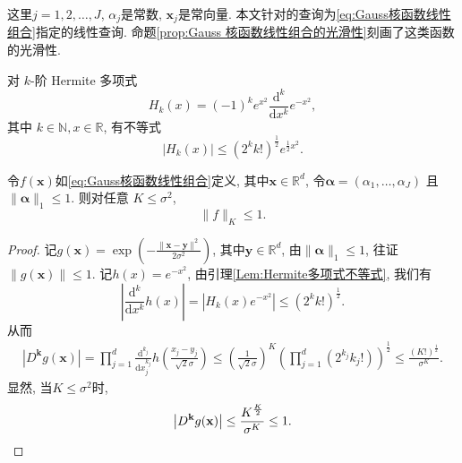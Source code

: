 这里$j = 1, 2, \dots, J$, $\alpha_j$是常数, $\mathbf{x}_j$是常向量. 本文针对的查询为\eqref{eq:Gauss核函数线性组合}指定的线性查询. 命题\ref{prop:Gauss 核函数线性组合的光滑性}刻画了这类函数的光滑性.
\begin{lem}\label{Lem:Hermite多项式不等式}
  对 $k$-阶 Hermite 多项式
  \[
  H_k(x) = (-1)^k e^{x^2} \frac{\mathrm{d}^k}{\mathrm{d}x^k}e^{-x^2},
  \]
  其中 $k \in \mathbb{N}, x \in \mathbb R$, 有不等式
  \[
  |H_k(x)| \leq \left(2^k k!\right)^{\frac{1}{2}}e^{\frac{1}{2}x^2}.
  \]
\end{lem}
\begin{prop}\label{prop:Gauss 核函数线性组合的光滑性}
  令$f(\mathbf{x})$如\eqref{eq:Gauss核函数线性组合}定义, 其中$\mathbf{x}\in\mathbb R^d$, 令$\boldsymbol{\alpha} = (\alpha_1,\ldots,\alpha_J)$ 且 $\|\boldsymbol{\alpha}\|_1 \le 1$. 则对任意 $K \le  \sigma^2$, \[
    \|f\|_{K} \le 1.
  \]
\end{prop}
\begin{proof}
  记$g(\mathbf{x}) = \exp \left(- \frac{\|\mathbf{x}-\mathbf{y}\|^2}{2 \sigma^2} \right)$, 其中$\mathbf{y}\in\mathbb R^d$, 由$\|\boldsymbol{\alpha}\|_1 \le 1$, 往证$\|g(\mathbf{x})\|\le1$. 记$h(x) = e^{-x^2}$, 由引理\ref{Lem:Hermite多项式不等式}, 我们有
  \[
    \left|\frac{\mathrm{d}^k}{\mathrm{d}x^k} h(x)\right| = \left|H_k(x)e^{-x^2}\right| \le \left(2^k k!\right)^{\frac{1}{2}}.
  \]
  从而
  \begin{align*}
    \left|D^{\mathbf{k}}g(\mathbf{x})\right|
    = \prod_{j=1}^d \frac{\mathrm{d}^{k_j}}{\mathrm{d}x_j^{k_j}}
    h\left(\frac{x_j-y_j}{\sqrt{2}\sigma} \right) \leq \left(\frac{1}{\sqrt{2}\sigma}\right)^{K}\left(\prod_{j=1}^d\left(2^{k_j}k_j!\right)\right)
    ^{\frac{1}{2}} \leq \frac{(K!)^{\frac{1}{2}}}{\sigma^K}.
  \end{align*}
  显然, 当$K\le\sigma^2$时, 
  \[
    \left|D^{\mathbf{k}}g(\mathbf{x})\right|\leq\frac{K^{\frac{K}{2}}}{\sigma^K}\leq 1. \qedhere
  \]
\end{proof}
